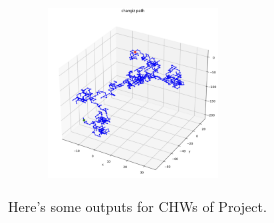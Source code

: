 \documentclass[30pt]{article}
\begin{document}
\begin{figure} %
    \centering
    \includegraphics[width=170,height = 170]{pic/fig/prob_Project-3.png}
\end{figure}
Here's some outputs for CHWs of Project. 
\newpage
\pagestyle{fancy}
\chead{{\large \lesson}}
\lhead{\detail}
\rhead{\master}
\rfoot{\name}
\lfoot{{\subject}}
\cfoot{\thepage}
\renewcommand{\footrulewidth}{1pt}
\end{document}

